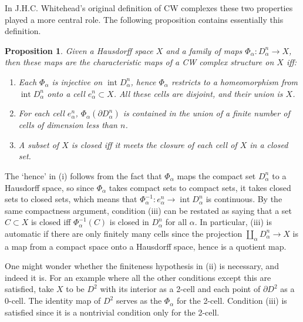 \documentclass{article}
\newtheorem{proposition}[theorem]{Proposition}
\theoremstyle{definition}
\begin{document}
In J.H.C. Whitehead's original definition of CW complexes these two properties played a more central role. The following proposition contains essentially this definition.

\begin{proposition}
Given a Hausdorff space $X$ and a family of maps $\Phi_{\alpha}: D_{\alpha}^{n} \to X$, then these maps are the characteristic maps of a CW complex structure on $X$ iff:
\begin{enumerate}
\item[(i)] Each $\Phi_{\alpha}$ is injective on $\operatorname{int} D_{\alpha}^{n}$, hence $\Phi_{\alpha}$ restricts to a homeomorphism from $\operatorname{int} D_{\alpha}^{n}$ onto a cell $e_{\alpha}^{n} \subset X$. All these cells are disjoint, and their union is $X$.
\item[(ii)] For each cell $e_{\alpha}^{n}$, $\Phi_{\alpha}(\partial D_{\alpha}^{n})$ is contained in the union of a finite number of cells of dimension less than $n$.
\item[(iii)] A subset of $X$ is closed iff it meets the closure of each cell of $X$ in a closed set.
\end{enumerate}
\end{proposition}

The `hence' in (i) follows from the fact that $\Phi_{\alpha}$ maps the compact set $D_{\alpha}^{n}$ to a Hausdorff space, so since $\Phi_{\alpha}$ takes compact sets to compact sets, it takes closed sets to closed sets, which means that $\Phi_{\alpha}^{-1}: e_{\alpha}^{n} \to \operatorname{int} D_{\alpha}^{n}$ is continuous. By the same compactness argument, condition (iii) can be restated as saying that a set $C \subset X$ is closed iff $\Phi_{\alpha}^{-1}(C)$ is closed in $D_{\alpha}^{n}$ for all $\alpha$. In particular, (iii) is automatic if there are only finitely many cells since the projection $\coprod_{\alpha} D_{\alpha}^{n} \to X$ is a map from a compact space onto a Hausdorff space, hence is a quotient map.

One might wonder whether the finiteness hypothesis in (ii) is necessary, and indeed it is. For an example where all the other conditions except this are satisfied, take $X$ to be $D^{2}$ with its interior as a 2-cell and each point of $\partial D^{2}$ as a 0-cell. The identity map of $D^{2}$ serves as the $\Phi_{\alpha}$ for the 2-cell. Condition (iii) is satisfied since it is a nontrivial condition only for the 2-cell.
\end{document}
